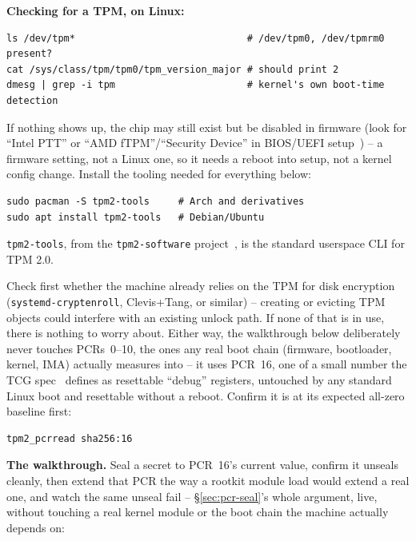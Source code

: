 \documentclass[11pt,a4paper]{article}
\begin{document}
\textbf{Checking for a TPM, on Linux:}

\begin{lstlisting}
ls /dev/tpm*                              # /dev/tpm0, /dev/tpmrm0 present?
cat /sys/class/tpm/tpm0/tpm_version_major # should print 2
dmesg | grep -i tpm                       # kernel's own boot-time detection
\end{lstlisting}

If nothing shows up, the chip may still exist but be disabled in
firmware (look for ``Intel PTT'' or ``AMD fTPM''/``Security Device'' in
BIOS/UEFI setup~\cite{uefispec}) -- a firmware setting, not a Linux one, so it needs a
reboot into setup, not a kernel config change. Install the tooling
needed for everything below:

\begin{lstlisting}
sudo pacman -S tpm2-tools     # Arch and derivatives
sudo apt install tpm2-tools   # Debian/Ubuntu
\end{lstlisting}
\noindent\texttt{tpm2-tools}, from the \texttt{tpm2-software}
project~\cite{tpm2software}, is the standard userspace CLI for TPM 2.0.

\begin{notebox}
Check first whether the machine already relies on the TPM for disk
encryption (\texttt{systemd-cryptenroll}, Clevis+Tang, or similar) --
creating or evicting TPM objects could interfere with an existing
unlock path. If none of that is in use, there is nothing to worry
about. Either way, the walkthrough below deliberately never touches
PCRs~0--10, the ones any real boot chain (firmware, bootloader,
kernel, IMA) actually measures into -- it uses PCR~16, one of a small
number the TCG spec~\cite{tcgpcr} defines as resettable ``debug'' registers,
untouched by any standard Linux boot and resettable without a reboot.
Confirm it is at its expected all-zero baseline first:
\end{notebox}

\begin{lstlisting}
tpm2_pcrread sha256:16
\end{lstlisting}

\textbf{The walkthrough.} Seal a secret to PCR~16's current value,
confirm it unseals cleanly, then extend that PCR the way a rootkit
module load would extend a real one, and watch the same unseal fail --
\S\ref{sec:pcr-seal}'s whole argument, live, without touching a real
kernel module or the boot chain the machine actually depends on:
\end{document}
